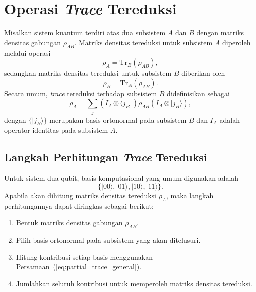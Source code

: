 \section{Operasi \textit{Trace} Tereduksi}
Misalkan sistem kuantum terdiri atas dua subsistem $A$ dan $B$ dengan matriks densitas gabungan $\rho_{AB}$. Matriks densitas tereduksi untuk subsistem $A$ diperoleh melalui operasi
\begin{equation}
\label{eq:partial_trace_def}
    \rho_A
    =
    \mathrm{Tr}_B(\rho_{AB}),
\end{equation}
sedangkan matriks densitas tereduksi untuk subsistem $B$ diberikan oleh
\begin{equation}
    \rho_B
    =
    \mathrm{Tr}_A(\rho_{AB}).
\end{equation}
Secara umum, \textit{trace} tereduksi terhadap subsistem $B$ didefinisikan sebagai
\begin{equation}
\label{eq:partial_trace_general}
    \rho_A
    =
    \sum_j
    \left(
    I_A \otimes \langle j_B|
    \right)
    \rho_{AB}
    \left(
    I_A \otimes |j_B\rangle
    \right),
\end{equation}
dengan $\{|j_B\rangle\}$ merupakan basis ortonormal pada subsistem $B$ dan $I_A$ adalah operator identitas pada subsistem $A$.

\subsection{Langkah Perhitungan \textit{Trace} Tereduksi}
Untuk sistem dua qubit, basis komputasional yang umum digunakan adalah
\begin{equation}
    \{
    |00\rangle,
    |01\rangle,
    |10\rangle,
    |11\rangle
    \}.
\end{equation}
Apabila akan dihitung matriks densitas tereduksi $\rho_A$, maka langkah perhitungannya dapat diringkas sebagai berikut:
\begin{enumerate}
    \item Bentuk matriks densitas gabungan $\rho_{AB}$.
    \item Pilih basis ortonormal pada subsistem yang akan ditelusuri.
    \item Hitung kontribusi setiap basis menggunakan Persamaan~(\ref{eq:partial_trace_general}).
    \item Jumlahkan seluruh kontribusi untuk memperoleh matriks densitas tereduksi.
\end{enumerate}

